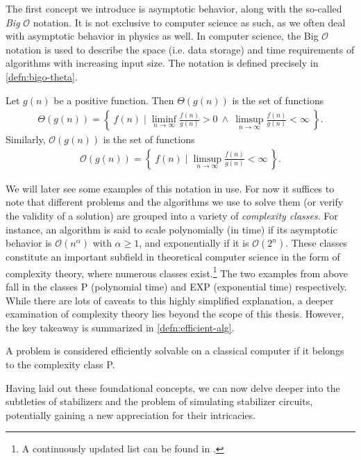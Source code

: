 The first concept we introduce is asymptotic behavior, along with the so-called
\emph{Big }$\mathcal{O}$ notation. It is not exclusive to computer science as such, as we
often deal with asymptotic behavior in physics as well.  In computer science,
the Big $\mathcal{O}$ notation is used to describe the space (i.e. data storage) and
time requirements of algorithms with increasing input size. The notation is
defined precisely in \cref{defn:bigo-theta}.
\begin{defn}\label{defn:bigo-theta}
  Let $g(n)$ be a positive function. Then $\Theta(g(n))$ is the set of
  functions 
  \begin{align*}
    \Theta(g(n)) = \left\{ \ f(n) \mid \liminf_{n\to\infty} \frac{f(n)}{g(n)} > 0 \
    \wedge \ \limsup_{n\to\infty} \frac{f(n)}{g(n)} < \infty \ \right\}
  .\end{align*}
  Similarly, $\mathcal{O}(g(n))$ is the set of functions 
  \begin{align*}
    \mathcal{O}(g(n)) = \left\{ \ f(n) \mid 
    \limsup_{n\to\infty} \frac{f(n)}{g(n)} < \infty \ \right\}
  .\end{align*}
\end{defn}
We will later see some examples of this notation in use. For now it suffices to
note that different problems and the algorithms we use to solve them (or verify
the validity of a solution) are grouped into a variety of \emph{complexity
classes}. For instance, an algorithm is said to scale polynomially (in time) if
its asymptotic behavior is $\mathcal{O}(n^\alpha)$ with $\alpha \geq 1$, and
exponentially if it is $\mathcal{O}(2^n)$. These classes constitute an
important subfield in theoretical computer science in the form of
complexity theory, where numerous classes exist.\footnote{A continuously
updated list can be found in \cite{ComplexityZoo}.} The two examples from above
fall in the classes \textsf{P} (polynomial time) and \textsf{EXP} (exponential
time) respectively.  While there are lots of caveats to this highly simplified
explanation, a deeper examination of complexity theory lies beyond the scope of
this thesis. However, the key takeaway is summarized in
\cref{defn:efficient-alg}.
\begin{defn}\label{defn:efficient-alg}
  A problem is considered efficiently solvable on a classical computer if it
  belongs to the complexity class \textsf{P}.
\end{defn}
Having laid out these foundational concepts, we can now delve deeper into the
subtleties of stabilizers and the problem of simulating stabilizer
circuits, potentially gaining a new appreciation for their intricacies.

